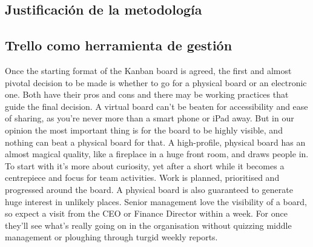 \subsection{Justificación de la metodología}



\subsection{Trello como herramienta de gestión}\label{subsec:trello}

Once the starting format of the Kanban board is agreed, the
first and almost pivotal decision to be made is whether to go for
a physical board or an electronic one. Both have their pros and
cons and there may be working practices that guide the final
decision. A virtual board can't be beaten for accessibility and
ease of sharing, as you're never more than a smart phone or
iPad away. But in our opinion the most important thing is for
the board to be highly visible, and nothing can beat a physical
board for that.
A high-profile, physical board has an almost magical quality, like
a fireplace in a huge front room, and draws people in. To start
with it's more about curiosity, yet after a short while it becomes
a centrepiece and focus for team activities. Work is planned,
prioritised and progressed around the board. A physical board
is also guaranteed to generate huge interest in unlikely places.
Senior management love the visibility of a board, so expect a
visit from the CEO or Finance Director within a week. For
once they'll see what's really going on in the organisation
without quizzing middle management or ploughing through
turgid weekly reports.

